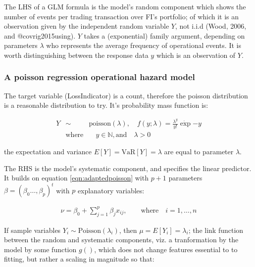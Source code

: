 \documentclass[]{DissertateUSU}
\begin{document}
The LHS of a GLM formula is the model's random component which shows the
number of events per trading transaction over FI's portfolio; of which
it is an observation given by the independent random variable \(Y\), not
i.i.d (Wood, 2006, and @covrig2015using). \(Y\) takes a (exponential)
family argument, depending on parameters \(\lambda\) who represents the
average frequency of operational events. It is worth distinguishing
between the response data \(y\) which is an observation of
\(Y\).\medskip

\subsubsection{A poisson regression operational hazard model}

The target variable (LossIndicator) is a count, therefore the poisson
distribution is a reasonable distribution to try. It's probability mass
function is: \singlespacing

\begin{eqnarray}\label{eqn:Poisson}
Y &\sim& \mbox{poisson}(\lambda), \quad f(y;\lambda) = \frac{\lambda^y}{y!}\dot\exp{-y}\\
 &\mbox{where}& \quad y \in  \mathbb{N}, \mbox{and} \quad \lambda > 0 \nonumber
\end{eqnarray}

\doublespacing
the expectation and variance
\(E[Y] = \mbox{VaR}[Y] = \lambda\)
are equal to parameter \(\lambda\).\medskip

The RHS is the model's systematic component, and specifies the linear
predictor. It builds on equation \ref{eqn:adaptedpoisson} with \(p+1\)
parameters \(\beta = (\beta_0\ldots,\beta_p)^t\) with \(p\) explanatory
variables: \singlespacing

\begin{eqnarray}
\nu = \beta_0 + \sum_{j=1}^{p}\beta_jx_{ij}, \qquad \mbox{where} \quad i = 1,\ldots,n
\end{eqnarray}

\doublespacing

If sample variables \(Y_i \sim \mbox{Poisson}(\lambda_i)\), then
\(\mu = E[Y_i] = \lambda_i\); the link function between the random and
systematic components, viz. a tranformation by the model by some
function \(g()\), which does not change features essential to to
fitting, but rather a scaling in magnitude so that:
\end{document}
